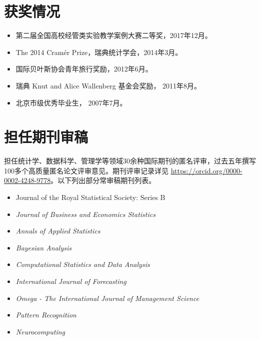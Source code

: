 \documentclass[twoside,a4paper,11pt]{article}
\begin{document}
\section{获奖情况}
\begin{itemize}

\item 第二届全国高校经管类实验教学案例大赛二等奖，2017年12月。
\item The 2014 Cramér Prize，瑞典统计学会，2014年3月。

\item 国际贝叶斯协会青年旅行奖励，2012年6月。

\item 瑞典 Knut and Alice Wallenberg 基金会奖励， 2011年8月。

\item 北京市级优秀毕业生， 2007年7月。
\end{itemize}

\section{担任期刊审稿}
担任统计学、数据科学、管理学等领域30余种国际期刊的匿名评审，过去五年撰写100多个高质量匿名论文评审意见。期刊评审记录详见 \url{https://orcid.org/0000-0002-4248-9778}。以下列出部分常审稿期刊列表。

\begin{itemize}
\item {Journal of the Royal Statistical Society: Series B}
\item \emph{Journal of Business and Economics Statistics}
\item \emph{Annals of Applied Statistics}
\item \emph{Bayesian Analysis}
\item \emph{Computational Statistics and Data Analysis}
\item \emph{International Journal of Forecasting}
\item \emph{Omega - The International Journal of Management Science}
\item \emph{Pattern Recognition}
\item \emph{Neurocomputing}
\end{itemize}
\end{document}
